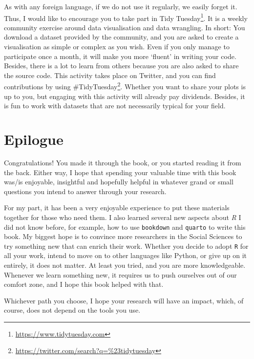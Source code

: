 \documentclass[
  letterpaper,
]{krantz}
\renewcommand{\href}[2]{#2\footnote{\url{#1}}}
\begin{document}
As with any foreign language, if we do not use it regularly, we easily
forget it. Thus, I would like to encourage you to take part in
\href{https://www.tidytuesday.com}{Tidy Tuesday}. It is a weekly
community exercise around data visualisation and data wrangling. In
short: You download a dataset provided by the community, and you are
asked to create a visualisation as simple or complex as you wish. Even
if you only manage to participate once a month, it will make you more
`fluent' in writing your code. Besides, there is a lot to learn from
others because you are also asked to share the source code. This
activity takes place on Twitter, and you can find contributions by using
\href{https://twitter.com/search?q=\%23tidytuesday}{\#TidyTuesday}.
Whether you want to share your plots is up to you, but engaging with
this activity will already pay dividends. Besides, it is fun to work
with datasets that are not necessarily typical for your field.


\chapter*{Epilogue}\label{sec-epilogue}


Congratulations! You made it through the book, or you started reading it
from the back. Either way, I hope that spending your valuable time with
this book was/is enjoyable, insightful and hopefully helpful in whatever
grand or small questions you intend to answer through your research.

For my part, it has been a very enjoyable experience to put these
materials together for those who need them. I also learned several new
aspects about \emph{R} I did not know before, for example, how to use
\texttt{bookdown} and \texttt{quarto} to write this book. My biggest
hope is to convince more researchers in the Social Sciences to try
something new that can enrich their work. Whether you decide to adopt
\texttt{R} for all your work, intend to move on to other languages like
Python, or give up on it entirely, it does not matter. At least you
tried, and you are more knowledgeable. Whenever we learn something new,
it requires us to push ourselves out of our comfort zone, and I hope
this book helped with that.

Whichever path you choose, I hope your research will have an impact,
which, of course, does not depend on the tools you use.
\end{document}
